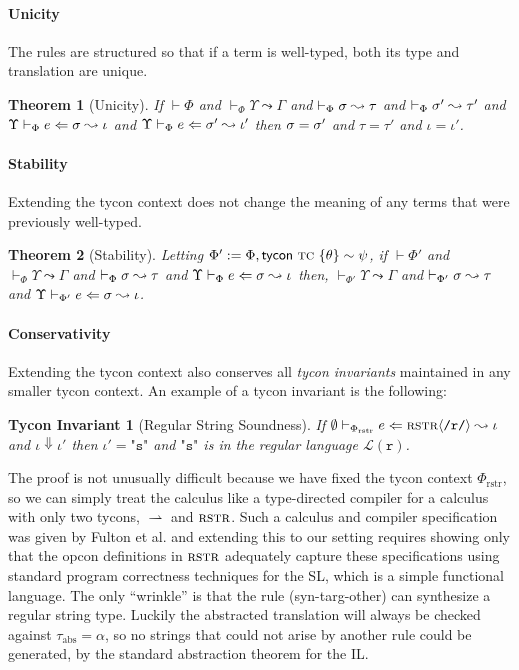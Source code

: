 \documentclass[10pt,preprint]{sigplanconf}
\newtheorem{theorem}{Theorem}
\newtheorem{tyconinvariant}{Tycon Invariant}
\newenvironment{proof-sketch}{\noindent{\emph{Proof Sketch.}}}{\qed}
\begin{document}
\paragraph{Unicity}
The rules are structured so that if a term is well-typed, both its type and translation are unique.
\begin{theorem}[Unicity]
If $\vdash \Phi$ and $\vdash_\Phi \Upsilon \leadsto \Gamma$ and $\vdash_\Phi \sigma \leadsto \tau$ and $\vdash_\Phi \sigma' \leadsto \tau'$ and $\Upsilon \vdash_{\Phi} e \Leftarrow \sigma \leadsto \iota$ and $\Upsilon \vdash_{\Phi} e \Leftarrow \sigma' \leadsto \iota'$ then $\sigma = \sigma'$ and $\tau=\tau'$ and $\iota = \iota'$.
\end{theorem}

\paragraph{Stability}
Extending the tycon context does not change the meaning of any terms that were previously well-typed.
\begin{theorem}[Stability]
Letting $\Phi' := \Phi, {\sf tycon}~\textsc{tc} ~\{\theta\} \sim \psi$, if $\vdash \Phi'$ and $\vdash_\Phi \Upsilon \leadsto \Gamma$ and $\vdash_\Phi \sigma \leadsto \tau$ and $\Upsilon \vdash_{\Phi} e \Leftarrow \sigma \leadsto \iota$ then, $\vdash_{\Phi'} \Upsilon \leadsto \Gamma$ and $\vdash_{\Phi'} \sigma \leadsto \tau$ and $\Upsilon \vdash_{\Phi'} e \Leftarrow \sigma \leadsto \iota$.
\end{theorem}

\paragraph{Conservativity} 
Extending the tycon context also conserves all \emph{tycon invariants} maintained in any smaller tycon context. An example of a tycon invariant is the following:

\begin{tyconinvariant}[Regular String Soundness]
If $\emptyset \vdash_{\Phi_\text{rstr}} e \Leftarrow {\textsc{rstr}}\langle\texttt{/r/}\rangle \leadsto \iota$ and $\iota \Downarrow \iota'$ then $\iota'=\texttt{"s"}$ and $\texttt{"s"}$ is in the regular language $\mathcal{L}(\texttt{r})$.
\end{tyconinvariant}
\begin{proof-sketch} The proof is not unusually difficult because we have fixed the tycon context $\Phi_\text{rstr}$, so we can simply treat the calculus like a type-directed compiler for a calculus with only two tycons, $\rightharpoonup$ and $\textsc{rstr}$. Such a calculus and compiler specification was given by Fulton et al. \cite{sanitation-psp14} and extending this to our  setting requires showing only that the opcon definitions in $\textsc{rstr}$ adequately capture these specifications using standard program correctness techniques for the SL, which is a simple functional language. The only ``wrinkle'' is that the rule (syn-targ-other) can synthesize a regular string type. Luckily the abstracted translation will always be checked against $\tau_\text{abs}=\alpha$, so no strings that could not arise by another rule could  be generated, by the standard abstraction theorem for the IL. \end{proof-sketch}
\end{document}
